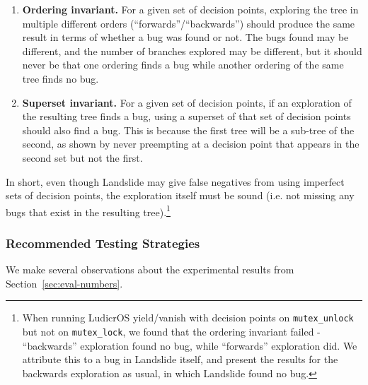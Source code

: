 \begin{enumerate}
	\item {\bf Ordering invariant.} For a given set of decision points, exploring the tree in multiple different orders (``forwards''/``backwards'') should produce the same result in terms of whether a bug was found or not. The bugs found may be different, and the number of branches explored may be different, but it should never be that one ordering finds a bug while another ordering of the same tree finds no bug.
	\item {\bf Superset invariant.} For a given set of decision points, if an exploration of the resulting tree finds a bug, using a superset of that set of decision points should also find a bug. This is because the first tree will be a sub-tree of the second, as shown by never preempting at a decision point that appears in the second set but not the first.
\end{enumerate}

In short, even though Landslide may give false negatives from using imperfect sets of decision points, the exploration itself must be sound (i.e. not missing any bugs that exist in the resulting tree).\footnote{
When running LudicrOS yield/vanish with decision points on \texttt{mutex\_unlock} but not on \texttt{mutex\_lock}, we found that the ordering invariant failed - ``backwards'' exploration found no bug, while ``forwards'' exploration did. We attribute this to a bug in Landslide itself, and present the results for the backwards exploration as usual, in which Landslide found no bug.}

\subsubsection{Recommended Testing Strategies}
\label{sec:discussion-strategies}

We make several observations about the experimental results from Section~\ref{sec:eval-numbers}.

